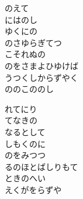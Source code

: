 \documentclass[10pt,b5j]{tarticle} %
\begin{document}
\begin{enumerate}
\begin{minipage}[c]{\blocksize}
    \end{minipage}
    \begin{minipage}[c]{\blocksize}
        
        \vspace{\linespace}
        \item
        のえて\\
        にはのし\\
        ゆくにの\\
        のさゆらぎてつ\\
        こそれぬの\\
        のをさまよひゆけば\\
        うつくしからずやく\\
        ののこののし\\
        
        \vspace{\linespace}
        \item
        れてにり\\
        てなきの\\
        なるとして\\
        しもくのに\\
        のをみつつ\\
        るのほとばしりもて\\
        ときのへい\\
        えくがをらずや \\

    \end{minipage}
\end{enumerate} %
\end{document}
